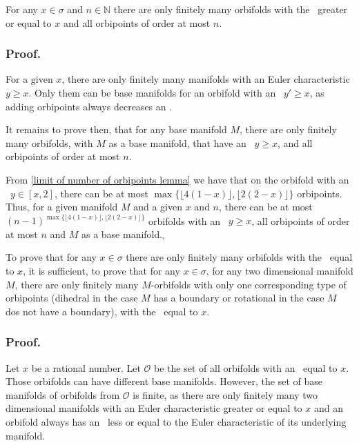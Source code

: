 
\begin{observation}\label{first_finiteness_theorem}
For any $x \in \sigma$ and $n \in \mathbb{N}$ there are only finitely many orbifolds 
with the \Eoc\ greater or equal to $x$ and all orbipoints of order at most $n$.
\end{observation}
\subsubsection{Proof.} 

For a given $x$, there are only finitely many manifolds 
with an Euler characteristic $y \geq x$. Only them can be 
base manifolds for an orbifold with an \Eoc\ $y'\geq x$, as adding orbipoints always 
decreases an \Eoc. 

It remains to prove then, that for any base manifold $M$, there are only finitely many orbifolds, 
with $M$ as a base manifold, that have 
 an \Eoc\ $y \geq x$, and all orbipoints of order at most $n$.

From \ref{limit of number of orbipoints lemma} we have that 
on the orbifold with an \Eoc\ $y \in [x,2]$, there can be at most 
$\max \{\lfloor 4(1-x) \rfloor, \lfloor 2(2-x) \rfloor\}$ orbipoints. 
Thus, for a given manifold $M$ and a given $x$ and $n$, there can be at most 
$(n-1)^{\max \{\lfloor 4(1-x) \rfloor, \lfloor 2(2-x) \rfloor\}}$ orbifolds with an \Eoc\ 
$y \geq x$, 
all orbipoints of order at most $n$ and $M$ as a base manifold.$_\square$ 

\begin{observation}\label{simplification of the finiteness theorem}
To prove that for any $x \in \sigma$ there are only finitely many orbifolds 
with the \Eoc\ equal to $x$, it is sufficient, to prove that 
for any $x \in \sigma$, for any two dimensional manifold $M$, there are only 
finitely many $M$-orbifolds with only one corresponding type of orbipoints (dihedral in the case 
$M$ has a boundary or rotational in the case $M$ dos not have a boundary), 
with the \Eoc\ equal to $x$.
\end{observation}
\subsubsection{Proof.}
Let $x$ be a rational number. 
Let $\mathcal{O}$ be the set of all orbifolds with 
an \Eoc\ equal to $x$. 
Those orbifolds can have different base manifolds. However, the set of base manifolds of 
orbifolds from $\mathcal{O}$ is finite, as there are only finitely many 
two dimensional manifolds with an Euler characteristic greater or equal to $x$ and an 
orbifold always has 
an \Eoc\ less or equal to the Euler characteristic of its underlying manifold. 

